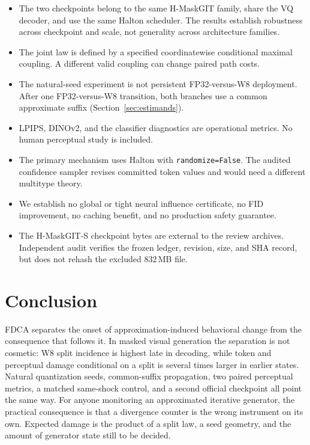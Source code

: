 \documentclass[11pt,a4paper]{article}
\theoremstyle{plain}
\theoremstyle{definition}
\theoremstyle{remark}
\begin{document}
\begin{itemize}[leftmargin=1.4em,itemsep=3pt]
\item The two checkpoints belong to the same H-MaskGIT family, share the VQ
decoder, and use the same Halton scheduler. The results establish robustness
across checkpoint and scale, not generality across architecture families.
\item The joint law is defined by a specified coordinatewise conditional maximal
coupling. A different valid coupling can change paired path costs.
\item The natural-seed experiment is not persistent FP32-versus-W8 deployment.
After one FP32-versus-W8 transition, both branches use a common approximate
suffix (Section~\ref{sec:estimands}).
\item LPIPS, DINOv2, and the classifier diagnostics are operational metrics. No
human perceptual study is included.
\item The primary mechanism uses Halton with \texttt{randomize=False}. The
audited confidence sampler revises committed token values and would need a
different multitype theory.
\item We establish no global or tight neural influence certificate, no FID
improvement, no caching benefit, and no production safety guarantee.
\item The H-MaskGIT-S checkpoint bytes are external to the review archives.
Independent audit verifies the frozen ledger, revision, size, and SHA record, but
does not rehash the excluded 832\,MB file.
\end{itemize}

\section{Conclusion}

FDCA separates the onset of approximation-induced behavioral change from the
consequence that follows it. In masked visual generation the separation is not
cosmetic: W8 split incidence is highest late in decoding, while token and
perceptual damage conditional on a split is several times larger in earlier
states. Natural quantization seeds, common-suffix propagation, two paired
perceptual metrics, a matched same-shock control, and a second official
checkpoint all point the same way. For anyone monitoring an approximated
iterative generator, the practical consequence is that a divergence counter is
the wrong instrument on its own. Expected damage is the product of a split law, a
seed geometry, and the amount of generator state still to be decided.
\end{document}
